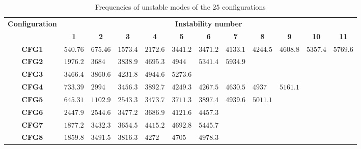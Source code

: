 \documentclass[final,1p]{elsarticle}
\begin{document}
	
\begin{table}[h!]
\centering
\caption{Frequencies of unstable modes of the $25$ configurations}
\small
\hspace*{-3.5cm}
\begin{tabularx}{20cm}{c*{11}{X}}
\toprule
\multirow{2}{*}{\textbf{Configuration}}								& \multicolumn{11}{c}{\textbf{Instability number}} \\
						&\multicolumn{1}{c}{\textbf{1}}			&\multicolumn{1}{c}{\textbf{2}}	 		&\multicolumn{1}{c}{\textbf{3}}	 		&\multicolumn{1}{c}{\textbf{4}}	 		&\multicolumn{1}{c}{\textbf{5}}	 		&\multicolumn{1}{c}{\textbf{6}}	 		&\multicolumn{1}{c}{\textbf{7}}			&\multicolumn{1}{c}{\textbf{8}}	 		&\multicolumn{1}{c}{\textbf{9}}	 		&\multicolumn{1}{c}{\textbf{10}}	 		&\multicolumn{1}{c}{\textbf{11}}	 	\\ 
 \midrule
\textbf{CFG1} 				&$540.76 $ 			&$675.46$ 			&$1573.4$ 		&$2172.6$ 		&$3441.2$ 		&$3471.2$ 		&$4133.1$ 		&$4244.5$ 		&$4608.8$ 		&$5357.4$ 		&$5769.6$ 		\\
\textbf{CFG2}					&$1976.2$ 			&$3684	$ 				&$3838.9$ 		&$4695.3$ 		&$4944$ 			&$5341.4$ 		&$5934.9$ 		&						&						&						&					\\
\textbf{CFG3}					&$3466.4$ 			&$3860.6$ 			&$4231.8$ 		&$4944.6$ 		&$5273.6$ 		&						&						&						&						&						&					\\
\textbf{CFG4}					&$733.39$ 			&$2994$ 				&$3456.3$ 		&$3892.7$ 		&$4249.3$ 		&$4267.5$ 		&$4630.5$ 		&$4937	$ 			&$5161.1$ 		&						&					\\
\textbf{CFG5}					&$645.31$ 			&$1102.9$ 			&$2543.3$ 		&$3473.7$ 		&$3711.3$ 		&$3897.4$ 		&$4939.6$ 		&$5011.1$ 		&						&						&					\\
\textbf{CFG6}					&$2447.9$ 			&$2544.6$ 			&$3477.2$ 		&$3686.9$ 		&$4121.6$ 		&$4457.3$ 		&						&						&						&						&					\\
\textbf{CFG7}					&$1877.2$ 			&$3432.3$ 			&$3654.5$ 		&$4415.2$ 		&$4692.8$ 		&$5445.7$ 		&						&						&						&						&					\\
\textbf{CFG8}					&$1859.8$ 			&$3491.5$ 			&$3816.3$ 		&$4272	$ 			&$4705$ 			&$4978.3$ 		&						&						&						&						&					\\

\end{tabularx}
\end{table}
\end{document}
